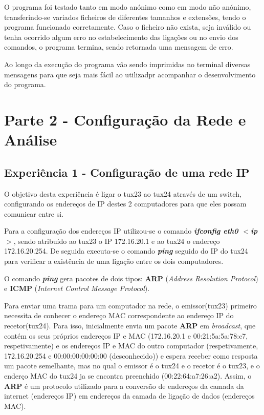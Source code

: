 \documentclass[11pt]{article}
\begin{document}
O programa foi testado tanto em modo anónimo como em modo não anónimo, transferindo-se variados ficheiros de diferentes tamanhos e extensões, tendo o programa funcionado corretamente. Caso o ficheiro não exista, seja inválido ou tenha ocorrido algum erro no estabelecimento das ligações ou no envio dos comandos, o programa termina, sendo retornada uma mensagem de erro. 

Ao longo da execução do programa vão sendo imprimidas no terminal diversas mensagens para que seja mais fácil ao utilizadpr acompanhar o desenvolvimento do programa.

\section{Parte 2 - Configuração da Rede e Análise} 

\subsection{Experiência 1 - Configuração de uma rede IP}

O objetivo desta experiência é ligar o tux23 ao tux24 através de um switch, configurando os endereços de IP destes 2 computadores para que eles possam comunicar entre si.

Para a configuração dos endereços IP utilizou-se o comando \textit{\textbf{ifconfig eth0 $<$ip$>$}}, sendo atribuído ao tux23 o IP 172.16.20.1 e ao tux24 o endereço 172.16.20.254. De seguida executa-se o comando \textit{\textbf{ping}} seguido do IP do tux24 para verificar a existência de uma ligação entre os dois computadores. 

O comando \textit{\textbf{ping}} gera pacotes de dois tipos: \textbf{ARP} (\textit{Address Resolution Protocol}) e \textbf{ICMP} (\textit{Internet Control Message Protocol}).

Para enviar uma trama para um computador na rede, o emissor(tux23) primeiro necessita de conhecer o endereço MAC correspondente ao endereço IP do recetor(tux24). Para isso, inicialmente envia um pacote \textbf{ARP} em \textit{broadcast}, que contém os seus próprios endereços IP e MAC (172.16.20.1 e 00:21:5a:5a:78:c7, respetivamente) e os endereços IP e MAC do outro computador (respetivamente, 172.16.20.254 e 00:00:00:00:00:00 (desconhecido)) e espera receber como resposta um pacote semelhante, mas no qual o emissor é o tux24 e o recetor é o tux23, e o enderço MAC do tux24 ja se encontra preenchido (00:22:64:a7:26:a2). Assim, o \textbf{ARP} é um protocolo utilizado para a conversão de endereços da camada da internet (endereços IP) em endereços da camada de ligação de dados (endereços MAC). 
\end{document}
